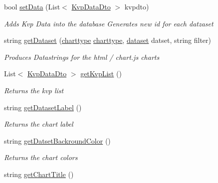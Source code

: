 \begin{DoxyCompactItemize}
bool \hyperlink{classkpi_mvc_api_1_1_data_transfer_objects_1_1_kvp_data_dto_rs_aab05e9ab80b2e766a6744a200e4d8e91}{set\+Data} (List$<$ \hyperlink{classkpi_mvc_api_1_1_data_transfer_objects_1_1_kvp_data_dto}{Kvp\+Data\+Dto} $>$ kvpdto)
\begin{DoxyCompactList}\small\item\em Adds Kvp Data into the database Generates new id for each datzaset \end{DoxyCompactList}\item 
string \hyperlink{classkpi_mvc_api_1_1_data_transfer_objects_1_1_kvp_data_dto_rs_aded42b5e75fcbc416d4ac02875c34849}{get\+Dataset} (\hyperlink{classkpi_mvc_api_1_1_data_transfer_objects_1_1_kvp_data_dto_rs_a829c595d537885ae923de884be501246}{charttype} \hyperlink{classkpi_mvc_api_1_1_data_transfer_objects_1_1_kvp_data_dto_rs_a829c595d537885ae923de884be501246}{charttype}, \hyperlink{classkpi_mvc_api_1_1_data_transfer_objects_1_1_kvp_data_dto_rs_aec5ef29d115053aa1f78d15adc7e1373}{dataset} datset, string filter)
\begin{DoxyCompactList}\small\item\em Produces Datastrings for the html / chart.\+js charts \end{DoxyCompactList}\item 
List$<$ \hyperlink{classkpi_mvc_api_1_1_data_transfer_objects_1_1_kvp_data_dto}{Kvp\+Data\+Dto} $>$ \hyperlink{classkpi_mvc_api_1_1_data_transfer_objects_1_1_kvp_data_dto_rs_ac1bd4b0312a7a0a07b8848d9cdf739da}{get\+Kvp\+List} ()
\begin{DoxyCompactList}\small\item\em Returns the kvp list \end{DoxyCompactList}\item 
string \hyperlink{classkpi_mvc_api_1_1_data_transfer_objects_1_1_kvp_data_dto_rs_a29e122aca7de38b447056485ad8b4afa}{get\+Dataset\+Label} ()
\begin{DoxyCompactList}\small\item\em Returns the chart label \end{DoxyCompactList}\item 
string \hyperlink{classkpi_mvc_api_1_1_data_transfer_objects_1_1_kvp_data_dto_rs_ac08415561811e16a01e4fa425709905b}{get\+Datset\+Backround\+Color} ()
\begin{DoxyCompactList}\small\item\em Returns the chart colors \end{DoxyCompactList}\item 
string \hyperlink{classkpi_mvc_api_1_1_data_transfer_objects_1_1_kvp_data_dto_rs_ac1a9b5ca7012ddd12549e157929f23e7}{get\+Chart\+Title} ()

\end{DoxyCompactItemize}
